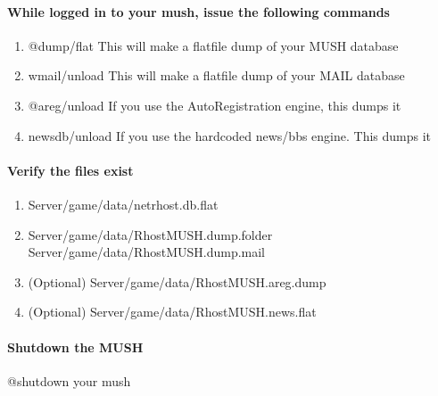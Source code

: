 \documentclass[letterpaper,10pt,english]{sphinxmanual}
\begin{document}
\paragraph{While logged in to your mush, issue the following commands}
\label{\detokenize{upgrade:while-logged-in-to-your-mush-issue-the-following-commands}}\begin{enumerate}
%
\item {} 
\sphinxAtStartPar
@dump/flat    \textendash{} This will make a flatfile dump of your MUSH database

\item {} 
\sphinxAtStartPar
wmail/unload  \textendash{} This will make a flatfile dump of your MAIL database

\item {} 
\sphinxAtStartPar
@areg/unload  \textendash{} If you use the AutoRegistration engine, this dumps it

\item {} 
\sphinxAtStartPar
newsdb/unload \textendash{} If you use the hardcoded news/bbs engine.  This dumps it

\end{enumerate}


\paragraph{Verify the files exist}
\label{\detokenize{upgrade:verify-the-files-exist}}\begin{enumerate}
%
\item {} 
\sphinxAtStartPar
Server/game/data/netrhost.db.flat

\item {} 
\sphinxAtStartPar
Server/game/data/RhostMUSH.dump.folder
Server/game/data/RhostMUSH.dump.mail

\item {} 
\sphinxAtStartPar
(Optional) Server/game/data/RhostMUSH.areg.dump

\item {} 
\sphinxAtStartPar
(Optional) Server/game/data/RhostMUSH.news.flat

\end{enumerate}


\paragraph{Shutdown the MUSH}
\label{\detokenize{upgrade:shutdown-the-mush}}
\sphinxAtStartPar
@shutdown your mush
\end{document}
